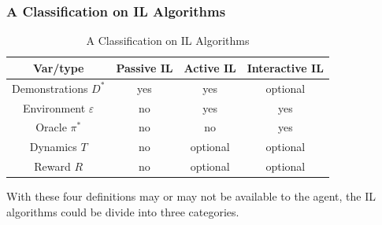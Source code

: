 \documentclass[11pt]{article}
\begin{document}
\subsubsection{A Classification on IL Algorithms}
\begin{table}[h]
\centering
\begin{tabular}{|c|c|c|c|}
\hline
Var/type        & Passive IL & Active IL & Interactive IL \\ \hline
Demonstrations $D^*$     & yes        & yes       & optional       \\ \hline
Environment $\varepsilon$ & no         & yes       & yes            \\ \hline
Oracle $\pi^*$           & no         & no        & yes            \\ \hline
Dynamics $T$             & no         & optional  & optional       \\ \hline
Reward $R$               & no         & optional  & optional       \\ \hline
\end{tabular}
\caption{ A Classification on IL Algorithms}
\label{tab:IL-type}
\end{table}

With these four definitions may or may not be available to the agent, the IL algorithms could be divide into three categories. 
\end{document}
